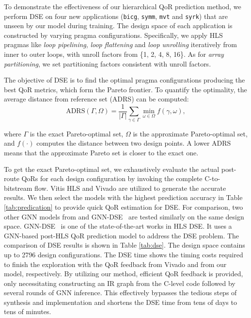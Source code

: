\documentclass[conference]{IEEEtran}
\begin{document}
To demonstrate the effectiveness of our hierarchical QoR prediction method, we perform DSE on four new applications (\verb|bicg|, \verb|symm|,  \verb|mvt| and \verb|syrk|) that are unseen by our model during training. The design space of each application is constructed by varying pragma configurations. Specifically, we apply HLS pragmas like \textit{loop pipelining}, \textit{loop flattening} and \textit{loop unrolling} iteratively from inner to outer loops, with unroll factors from \{1, 2, 4, 8, 16\}. As for \textit{array partitioning}, we set partitioning factors consistent with unroll factors. 

The objective of DSE is to find the optimal pragma configurations producing the best QoR metrics, which form the Pareto frontier. To quantify the optimality, the average distance from reference set (ADRS) can be computed:
\vspace{-0.1cm}
\begin{equation*}
\text{ADRS}(\Gamma, \Omega) = \frac{1}{|\Gamma|} \sum_{\gamma \in \Gamma} \min_{\omega \in \Omega} f(\gamma, \omega),
\end{equation*}

where $\Gamma$ is the exact Pareto-optimal set, $\Omega$ is the approximate Pareto-optimal set, and $f(\cdot)$ computes the distance between two design points. A lower ADRS means that the approximate Pareto set is closer to the exact one. 

To get the exact Pareto-optimal set, we exhaustively evaluate the actual post-route QoRs for each design configuration by invoking the complete C-to-bitstream flow. Vitis HLS and Vivado are utilized to generate the accurate results. We then select the models with the highest prediction accuracy in Table \ref{tab:predication} to provide quick QoR estimation for DSE. For comparison, two other GNN models from \cite{wu2022high} and GNN-DSE~\cite{sohrabizadeh2022gnn} are tested similarly on the same design space. GNN-DSE~\cite{sohrabizadeh2022gnn} is one of the state-of-the-art works in HLS DSE. It uses a GNN-based post-HLS QoR prediction model to address the DSE problem.
The comparison of DSE results is shown in Table \ref{tab:dse}. 
The design space contains up to 2796 design configurations. The DSE time shows the timing costs required to finish the exploration with the QoR feedback from Vivado and from our model, respectively. By utilizing our method, efficient QoR feedback is provided, only necessitating constructing an IR graph from the C-level code followed by several rounds of GNN inference. This effectively bypasses the tedious steps of synthesis and implementation and shortens the DSE time from tens of days to tens of minutes. 
\end{document}
